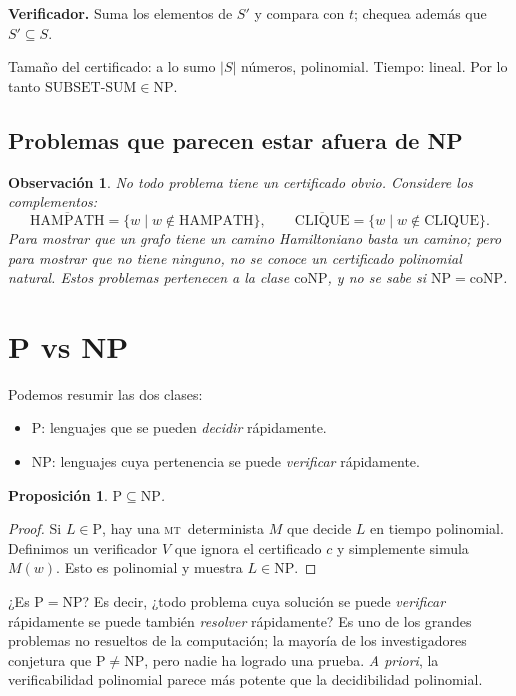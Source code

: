 \documentclass[11pt,a4paper]{article}
\theoremstyle{definicion}
\newtheorem{proposicion}[definicion]{Proposición}
\newtheorem{observacion}[definicion]{Observación}
\newcommand{\MT}{\textsc{mt}}
\newcommand{\NP}{\mathrm{NP}}
\newcommand{\Pclass}{\mathrm{P}}
\begin{document}
\textbf{Verificador.} Suma los elementos de $S'$ y compara con $t$; chequea además que $S' \subseteq S$.

Tamaño del certificado: a lo sumo $|S|$ números, polinomial. Tiempo: lineal. Por lo tanto $\mathrm{SUBSET\text{-}SUM} \in \NP$.

\subsection{Problemas que parecen estar afuera de NP}

\begin{observacion}
No todo problema tiene un certificado obvio. Considere los complementos:
\[
\overline{\mathrm{HAMPATH}} = \{ w \mid w \notin \mathrm{HAMPATH}\}, \qquad
\overline{\mathrm{CLIQUE}} = \{ w \mid w \notin \mathrm{CLIQUE}\}.
\]
Para mostrar que un grafo \emph{tiene} un camino Hamiltoniano basta un camino; pero para mostrar que \emph{no tiene} ninguno, no se conoce un certificado polinomial natural. Estos problemas pertenecen a la clase $\mathrm{coNP}$, y no se sabe si $\NP = \mathrm{coNP}$.
\end{observacion}

\section{P vs NP}

Podemos resumir las dos clases:
\begin{itemize}
    \item $\Pclass$: lenguajes que se pueden \emph{decidir} rápidamente.
    \item $\NP$: lenguajes cuya pertenencia se puede \emph{verificar} rápidamente.
\end{itemize}

\begin{proposicion}
$\Pclass \subseteq \NP$.
\end{proposicion}

\begin{proof}
Si $L \in \Pclass$, hay una \MT\ determinista $M$ que decide $L$ en tiempo polinomial. Definimos un verificador $V$ que ignora el certificado $c$ y simplemente simula $M(w)$. Esto es polinomial y muestra $L \in \NP$.
\end{proof}

\begin{tcolorbox}[colback=yellow!10!white, colframe=orange!70!black, title=\textbf{Pregunta abierta: $\Pclass \overset{?}{=} \NP$}, fonttitle=\bfseries]
¿Es $\Pclass = \NP$? Es decir, ¿todo problema cuya solución se puede \emph{verificar} rápidamente se puede también \emph{resolver} rápidamente? Es uno de los grandes problemas no resueltos de la computación; la mayoría de los investigadores conjetura que $\Pclass \neq \NP$, pero nadie ha logrado una prueba. \emph{A priori}, la verificabilidad polinomial parece más potente que la decidibilidad polinomial.
\end{tcolorbox}
\end{document}
